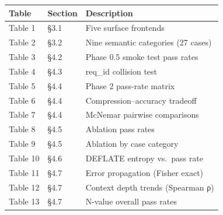{\def\LTcaptype{none} %

\begin{longtable}[]{@{}lll@{}}

\toprule\noalign{}

Table & Section & Description \\

\midrule\noalign{}

\endhead

\bottomrule\noalign{}

\endlastfoot

Table 1 & §3.1 & Five surface frontends \\

Table 2 & §3.2 & Nine semantic categories (27 cases) \\

Table 3 & §4.2 & Phase 0.5 smoke test pass rates \\

Table 4 & §4.3 & req\_id collision test \\

Table 5 & §4.4 & Phase 2 pass-rate matrix \\

Table 6 & §4.4 & Compression--accuracy tradeoff \\

Table 7 & §4.4 & McNemar pairwise comparisons \\

Table 8 & §4.5 & Ablation pass rates \\

Table 9 & §4.5 & Ablation by case category \\

Table 10 & §4.6 & DEFLATE entropy vs.~pass rate \\

Table 11 & §4.7 & Error propagation (Fisher exact) \\

Table 12 & §4.7 & Context depth trends (Spearman ρ) \\

Table 13 & §4.7 & N-value overall pass rates \\

\end{longtable}

}

